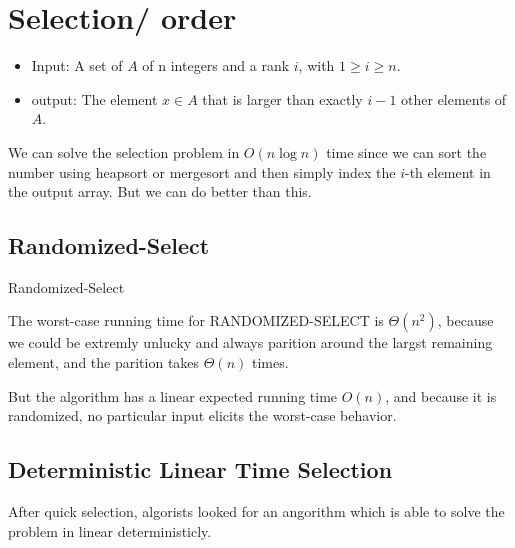 \documentclass[en,hazy,blue,screen,14pt]{elegantnote}
\begin{document}
\section{Selection/ order}
\begin{itemize}
\item Input: A set of $A$ of n integers and a rank $i$, with $1\ge i\ge n$.
\item output: The element $x\in A$ that is larger than exactly $i-1$ other
elements of $A$.
\end{itemize}
We can solve the selection problem in $O(n\log n)$ time since we
can sort the number using heapsort or mergesort and then simply index
the $i$-th element in the output array. But we can do better than this.

\subsection{Randomized-Select}
\begin{algorithm}[H]

 \caption{Randomized-Select}
\end{algorithm}
The worst-case running time for RANDOMIZED-SELECT is $\Theta(n^2)$, because we 
could be extremly unlucky and always parition around the largst remaining 
element, and the parition takes $\Theta(n)$ times.

But the algorithm has a linear expected running time $O(n)$, and because it is 
randomized, no particular input elicits the worst-case behavior.
\subsection{Deterministic Linear Time Selection}
After quick selection, algorists looked for an angorithm which is able to solve 
the problem in linear deterministicly.
\end{document}
